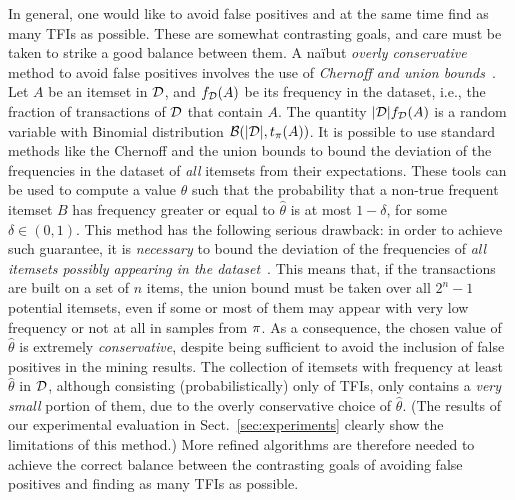 In general, one would like to avoid false positives and at the same time find as
many TFIs as possible. These are somewhat contrasting goals, and care must be
taken to strike a good balance between them.  A na\"i\ve but \emph{overly
conservative} method to avoid false positives involves the use of \emph{Chernoff
and union bounds}~\citep{MitzenmacherU05}.  Let $A$ be an itemset in ${\cal D}$, and
$f_{\cal D}(A)$ be its frequency in the dataset, i.e., the fraction of transactions
of ${\cal D}$ that contain $A$. The quantity $|{\cal D}|f_{\cal D}(A)$ is a random variable
with Binomial distribution $\mathcal{B}(|{\cal D}|,t_\pi(A))$. It is possible to use
standard methods like the Chernoff and the union bounds to bound the deviation
of the frequencies in the dataset of \emph{all} itemsets from their
expectations. These tools can be used to compute a value $\hat\theta$ such that
the probability that a non-true frequent itemset $B$ has frequency greater or
equal to $\hat\theta$ is at most $1-\delta$, for some $\delta\in(0,1)$. This
method has the following serious drawback: in order to achieve such guarantee,
it is \emph{necessary} to bound the deviation of the frequencies of \emph{all
itemsets possibly appearing in the dataset}~\citep{KirschMAPUV12}. This means
that, if the transactions are built on a set of $n$ items, the union bound must
be taken over all $2^n-1$ potential itemsets, even if some or most of them may
appear with very low frequency or not at all in samples from $\pi$. As a
consequence, the chosen value of $\hat\theta$ is extremely \emph{conservative},
despite being sufficient to avoid the inclusion of false positives in the mining
results. The collection of itemsets with frequency at least $\hat\theta$ in
${\cal D}$, although consisting (probabilistically) only of TFIs, only contains a
\emph{very small} portion of them, due to the overly conservative choice of
$\hat\theta$. (The results of our experimental evaluation in
Sect.~\ref{sec:experiments} clearly show the limitations of this method.) More
refined algorithms are therefore needed to achieve the correct balance between
the contrasting goals of avoiding false positives and finding as many TFIs as
possible.

